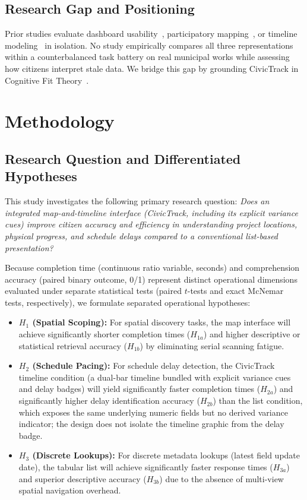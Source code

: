 \documentclass[runningheads]{llncs}
\newcommand{\hl}[1]{#1}
\begin{document}
\subsection{Research Gap and Positioning}
Prior studies evaluate dashboard usability~\cite{ansari2022enhancing,matheus2021design,nikiforova2021open}, participatory mapping~\cite{kytta2023prioritizing,johnson2024enhancing}, or timeline modeling~\cite{ayalew2024developing} in isolation. No study empirically compares all three representations within a counterbalanced task battery on real municipal works while assessing how citizens interpret stale data. We bridge this gap by grounding CivicTrack in Cognitive Fit Theory~\cite{bina2023incorporating,bacic2022advancing}.

\section{Methodology}

\subsection{Research Question and Differentiated Hypotheses}
This study investigates the following primary research question: \emph{Does an integrated map-and-timeline interface (CivicTrack, including its explicit variance cues) improve citizen accuracy and efficiency in understanding project locations, physical progress, and schedule delays compared to a conventional list-based presentation?}

Because completion time (continuous ratio variable, seconds) and comprehension accuracy (paired binary outcome, 0/1) represent distinct operational dimensions evaluated under separate statistical tests (paired $t$-tests and exact McNemar tests, respectively), we formulate separated operational hypotheses:
\begin{itemize}\setlength{\itemsep}{1.2pt}\setlength{\parskip}{0pt}
    \item \textbf{$H_1$ (Spatial Scoping):} For spatial discovery tasks, the map interface will achieve significantly shorter completion times ($H_{1a}$) and higher descriptive or statistical retrieval accuracy ($H_{1b}$) by eliminating serial scanning fatigue.
    \item \textbf{$H_2$ (Schedule Pacing):} \hl{For schedule delay detection, the CivicTrack timeline condition (a dual-bar timeline bundled with explicit variance cues and delay badges) will yield significantly faster completion times ($H_{2a}$) and significantly higher delay identification accuracy ($H_{2b}$) than the list condition, which exposes the same underlying numeric fields but no derived variance indicator; the design does not isolate the timeline graphic from the delay badge.}
    \item \textbf{$H_3$ (Discrete Lookups):} For discrete metadata lookups (latest field update date), the tabular list will achieve significantly faster response times ($H_{3a}$) and superior descriptive accuracy ($H_{3b}$) due to the absence of multi-view spatial navigation overhead.
\end{itemize}
\end{document}

